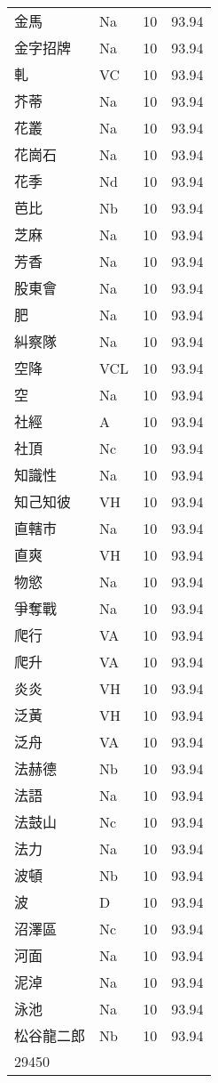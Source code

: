 \documentclass[twocolumn]{book}
\begin{document}
\begin{supertabular}{llrr}
金馬 & Na & 10 &  93.94\\
金字招牌 & Na & 10 &  93.94\\
軋 & VC & 10 &  93.94\\
芥蒂 & Na & 10 &  93.94\\
花叢 & Na & 10 &  93.94\\
花崗石 & Na & 10 &  93.94\\
花季 & Nd & 10 &  93.94\\
芭比 & Nb & 10 &  93.94\\
芝麻 & Na & 10 &  93.94\\
芳香 & Na & 10 &  93.94\\
股東會 & Na & 10 &  93.94\\
肥 & Na & 10 &  93.94\\
糾察隊 & Na & 10 &  93.94\\
空降 & VCL & 10 &  93.94\\
空 & Na & 10 &  93.94\\
社經 & A & 10 &  93.94\\
社頂 & Nc & 10 &  93.94\\
知識性 & Na & 10 &  93.94\\
知己知彼 & VH & 10 &  93.94\\
直轄市 & Na & 10 &  93.94\\
直爽 & VH & 10 &  93.94\\
物慾 & Na & 10 &  93.94\\
爭奪戰 & Na & 10 &  93.94\\
爬行 & VA & 10 &  93.94\\
爬升 & VA & 10 &  93.94\\
炎炎 & VH & 10 &  93.94\\
泛黃 & VH & 10 &  93.94\\
泛舟 & VA & 10 &  93.94\\
法赫德 & Nb & 10 &  93.94\\
法語 & Na & 10 &  93.94\\
法鼓山 & Nc & 10 &  93.94\\
法力 & Na & 10 &  93.94\\
波頓 & Nb & 10 &  93.94\\
波 & D & 10 &  93.94\\
沼澤區 & Nc & 10 &  93.94\\
河面 & Na & 10 &  93.94\\
泥淖 & Na & 10 &  93.94\\
泳池 & Na & 10 &  93.94\\
松谷龍二郎 & Nb & 10 &  93.94\\
29450\\

\end{supertabular}
\end{document}
